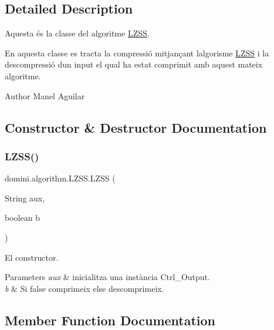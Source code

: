 \subsection{Detailed Description}
Aquesta és la classe del algoritme \hyperlink{classdomini_1_1algorithm_1_1LZSS}{L\+Z\+SS}. 

En aquesta classe es tracta la compressió mitjançant l\textquotesingle{}algorisme \hyperlink{classdomini_1_1algorithm_1_1LZSS}{L\+Z\+SS} i la descompressió d\textquotesingle{}un input el qual ha estat comprimit amb aquest mateix algoritme.

\begin{DoxyAuthor}{Author}
Manel Aguilar 
\end{DoxyAuthor}


\subsection{Constructor \& Destructor Documentation}
\mbox{\label{classdomini_1_1algorithm_1_1LZSS_a991f29ccc89ecbb5645ea8f123205e20}} 
\subsubsection{\texorpdfstring{L\+Z\+S\+S()}{LZSS()}}
{\footnotesize\ttfamily domini.\+algorithm.\+L\+Z\+S\+S.\+L\+Z\+SS (\begin{DoxyParamCaption}\item[{String}]{aux,  }\item[{boolean}]{b }\end{DoxyParamCaption})\hspace{0.3cm}{\ttfamily [inline]}}



El constructor. 


\begin{DoxyParams}{Parameters}
{\em aux} & inicialitza una instància Ctrl\+\_\+\+Output. \\
\hline
{\em b} & Si false comprimeix else descomprimeix. \\
\hline
\end{DoxyParams}


\subsection{Member Function Documentation}
\mbox{\label{classdomini_1_1algorithm_1_1LZSS_a385d06ea406b7a0f1168370e9574531a}} 
